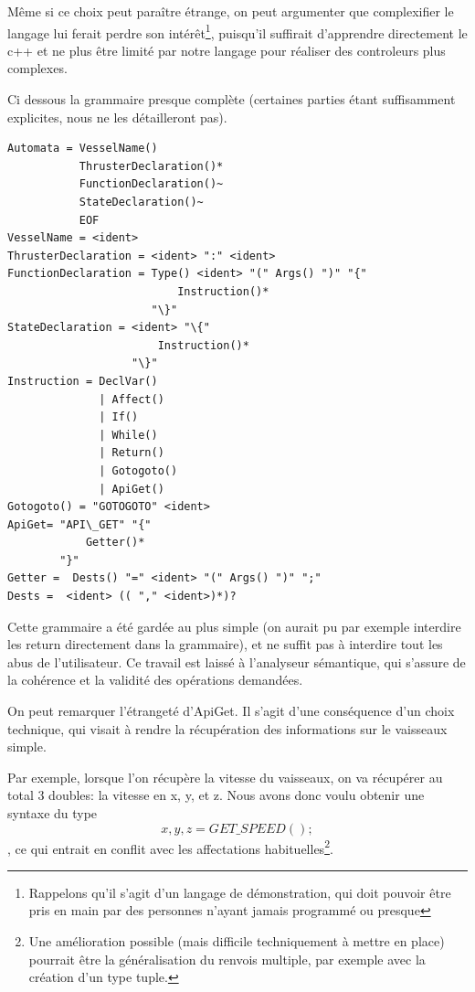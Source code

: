 \documentclass[a4paper,11pt]{article}
\begin{document}
        Même si ce choix peut paraître étrange, on peut argumenter que complexifier le langage lui ferait perdre son intérêt\footnote{Rappelons qu'il s'agit d'un langage de démonstration, qui doit pouvoir être pris en main par des personnes n'ayant jamais programmé ou presque}, puisqu'il suffirait d'apprendre directement le c++ et ne plus être limité par notre langage pour réaliser des controleurs plus complexes.
        
        Ci dessous la grammaire presque complète (certaines parties étant suffisamment explicites, nous ne les détailleront pas).

        \begin{Verbatim}[frame=single]
Automata = VesselName()
           ThrusterDeclaration()*
           FunctionDeclaration()~
           StateDeclaration()~
           EOF
VesselName = <ident>
ThrusterDeclaration = <ident> ":" <ident>
FunctionDeclaration = Type() <ident> "(" Args() ")" "{"
                          Instruction()*  
                      "\}"  
StateDeclaration = <ident> "\{"
                       Instruction()* 
                   "\}" 
Instruction = DeclVar()
              | Affect()
              | If() 
              | While() 
              | Return()
              | Gotogoto() 
              | ApiGet() 
Gotogoto() = "GOTOGOTO" <ident>
ApiGet= "API\_GET" "{" 
            Getter()*
        "}"
Getter =  Dests() "=" <ident> "(" Args() ")" ";"
Dests =  <ident> (( "," <ident>)*)?
        \end{Verbatim}

        Cette grammaire a été gardée au plus simple (on aurait pu par exemple interdire les return directement dans la grammaire), et ne suffit pas à interdire tout les abus de l'utilisateur. Ce travail est laissé à l'analyseur sémantique, qui s'assure de la cohérence et la validité des opérations demandées.
        
        On peut remarquer l'étrangeté d'ApiGet. Il s'agit d'une conséquence d'un choix technique, qui visait à rendre la récupération des informations sur le vaisseaux simple. 
        
        Par exemple, lorsque l'on récupère la vitesse du vaisseaux, on va récupérer au total 3 doubles: la vitesse en x, y, et z. Nous avons donc voulu obtenir une syntaxe du type \[ x,y,z = GET\_SPEED(); \], ce qui entrait en conflit avec les affectations habituelles\footnote{Une amélioration possible (mais difficile techniquement à mettre en place) pourrait être la généralisation du renvois multiple, par exemple avec la création d'un type tuple.}.
        
\end{document}
